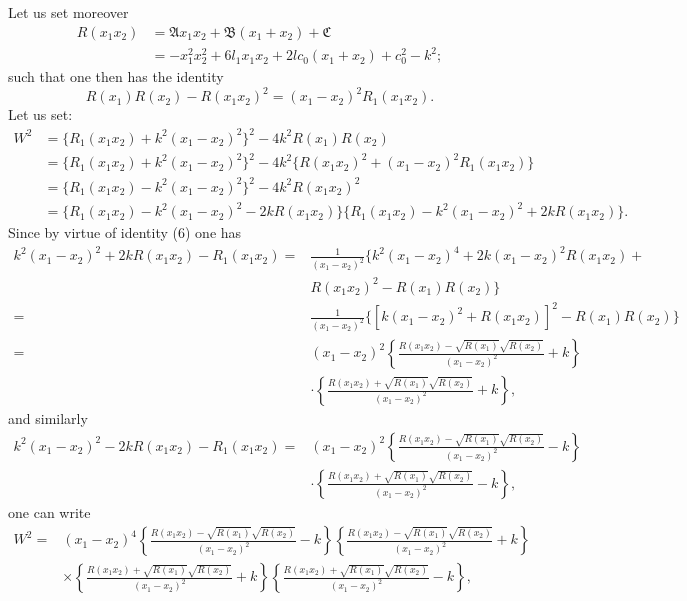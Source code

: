 \documentclass{article}
\begin{document}
Let us set moreover
\begin{align*}
R(x_1x_2) &= \mathfrak{A}x_1x_2 + \mathfrak{B}(x_1 + x_2) + \mathfrak{C} \\
&= -x_1^2x_2^2 + 6l_1x_1x_2 + 2lc_0(x_1 + x_2) + c_0^2 - k^2;
\end{align*}
such that one then has the identity
\begin{equation}
R(x_1)R(x_2) - R(x_1x_2)^2 = (x_1 - x_2)^2R_1(x_1x_2).
\end{equation}
Let us set:
\begin{equation}
\begin{aligned}
W^2 &= \{R_1(x_1x_2) + k^2(x_1 - x_2)^2\}^2 - 4k^2R(x_1)R(x_2) \\
&= \{R_1(x_1x_2) + k^2(x_1 - x_2)^2\}^2 - 4k^2\{R(x_1x_2)^2 + (x_1 - x_2)^2R_1(x_1x_2)\} \\
&= \{R_1(x_1x_2) - k^2(x_1 - x_2)^2\}^2 - 4k^2R(x_1x_2)^2 \\
&= \{R_1(x_1x_2) - k^2(x_1 - x_2)^2 - 2kR(x_1x_2)\}\{R_1(x_1x_2) - k^2(x_1 - x_2)^2 + 2kR(x_1x_2)\}.
\end{aligned}
\end{equation}
Since by virtue of identity (6) one has
\begin{align*}
k^2(x_1 - x_2)^2 + 2kR(x_1x_2) - R_1(x_1x_2) ={}& \frac{1}{(x_1 - x_2)^2}\{k^2(x_1 - x_2)^4 + 2k(x_1 - x_2)^2R(x_1x_2) + \\
&R(x_1x_2)^2 - R(x_1)R(x_2)\} \\
={}& \frac{1}{(x_1 - x_2)^2}\{[k(x_1 - x_2)^2 + R(x_1x_2)]^2 - R(x_1)R(x_2)\} \\
={}& (x_1 - x_2)^2\left\{\frac{R(x_1x_2) - \sqrt{R(x_1)}\sqrt{R(x_2)}}{(x_1 - x_2)^2} + k\right\} \\
& \cdot\left\{\frac{R(x_1x_2) + \sqrt{R(x_1)}\sqrt{R(x_2)}}{(x_1 - x_2)^2} + k\right\},
\end{align*}
and similarly
\begin{align*}
k^2(x_1 - x_2)^2 - 2kR(x_1x_2) - R_1(x_1x_2) =& (x_1 - x_2)^2\left\{\frac{R(x_1x_2) - \sqrt{R(x_1)}\sqrt{R(x_2)}}{(x_1 - x_2)^2} - k\right\} \\
&\cdot \left\{\frac{R(x_1x_2) + \sqrt{R(x_1)}\sqrt{R(x_2)}}{(x_1 - x_2)^2} - k\right\},
\end{align*}
one can write
\begin{equation}
    \tag{7'}
\begin{aligned}
W^2 ={}& (x_1 - x_2)^4\left\{\frac{R(x_1x_2) - \sqrt{R(x_1)}\sqrt{R(x_2)}}{(x_1 - x_2)^2} - k\right\}\left\{\frac{R(x_1x_2) - \sqrt{R(x_1)}\sqrt{R(x_2)}}{(x_1 - x_2)^2} + k\right\} \\
& \times \left\{\frac{R(x_1x_2) + \sqrt{R(x_1)}\sqrt{R(x_2)}}{(x_1 - x_2)^2} + k\right\}\left\{\frac{R(x_1x_2) + \sqrt{R(x_1)}\sqrt{R(x_2)}}{(x_1 - x_2)^2} - k\right\},
\end{aligned}
\end{equation}
\end{document}

